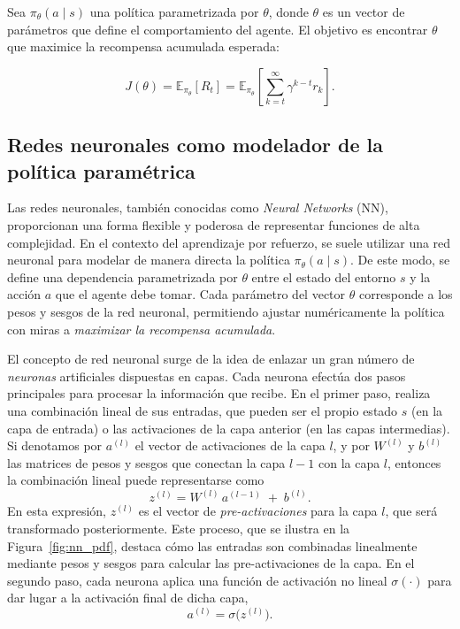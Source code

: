 \documentclass[11pt,a4paper,spanish]{article}
\numberwithin{equation}{section} %
\begin{document}
Sea $\pi_{\theta}(a \mid s)$ una política parametrizada por $\theta$, donde $\theta$ es un vector de parámetros que define el comportamiento del agente. El objetivo es encontrar $\theta$ que maximice la recompensa acumulada esperada:

\begin{equation}
J(\theta) = \mathbb{E}_{\pi_{\theta}}[R_t] = \mathbb{E}_{\pi_{\theta}}\left[\sum_{k=t}^{\infty} \gamma^{k-t} r_k\right].
\end{equation}

\subsection{Redes neuronales como modelador de la política paramétrica}
\label{subsubsec:redes_neuronales_politica}

Las redes neuronales, también conocidas como \textit{Neural Networks} (NN), proporcionan una forma flexible y poderosa de representar funciones de alta complejidad. En el contexto del aprendizaje por refuerzo, se suele utilizar una red neuronal para modelar de manera directa la política \(\pi_\theta(a \mid s)\). De este modo, se define una dependencia parametrizada por \(\theta\) entre el estado del entorno \(s\) y la acción \(a\) que el agente debe tomar. Cada parámetro del vector \(\theta\) corresponde a los pesos y sesgos de la red neuronal, permitiendo ajustar numéricamente la política con miras a \emph{maximizar la recompensa acumulada}.

El concepto de red neuronal surge de la idea de enlazar un gran número de \emph{neuronas} artificiales dispuestas en capas. Cada neurona efectúa dos pasos principales para procesar la información que recibe. En el primer paso, realiza una combinación lineal de sus entradas, que pueden ser el propio estado \(s\) (en la capa de entrada) o las activaciones de la capa anterior (en las capas intermedias). Si denotamos por \(a^{(l)}\) el vector de activaciones de la capa \(l\), y por \(W^{(l)}\) y \(b^{(l)}\) las matrices de pesos y sesgos que conectan la capa \(l-1\) con la capa \(l\), entonces la combinación lineal puede representarse como
\[
z^{(l)} = W^{(l)}\, a^{(l-1)} \;+\; b^{(l)}.
\]
En esta expresión, \(z^{(l)}\) es el vector de \emph{pre-activaciones} para la capa \(l\), que será transformado posteriormente. Este proceso, que se ilustra en la Figura~\ref{fig:nn_pdf}, destaca cómo las entradas son combinadas linealmente mediante pesos y sesgos para calcular las pre-activaciones de la capa. En el segundo paso, cada neurona aplica una función de activación no lineal \(\sigma(\cdot)\) para dar lugar a la activación final de dicha capa,
\[
a^{(l)} = \sigma\!\bigl(z^{(l)}\bigr).
\]
\end{document}
